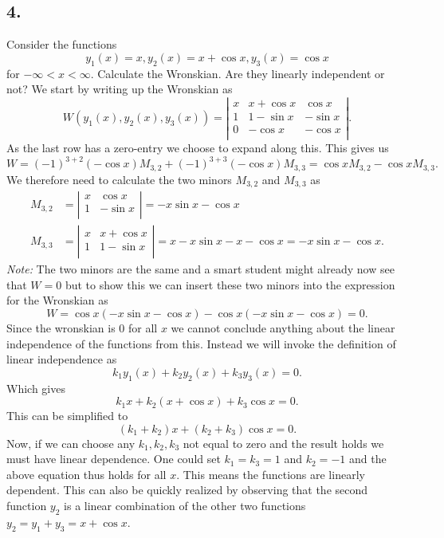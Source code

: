\subsection*{4.} Consider the functions
\[ 
y_1 (x) = x, y_2(x) = x + \cos x, y_3(x) = \cos x
\]
for $-\infty < x < \infty $. Calculate the Wronskian. Are they linearly independent or not?
\bigbreak
We start by writing up the Wronskian as
\[ 
W(y_1(x), y_2(x), y_3(x)) = \left| \begin{array}{ccc}
x & x + \cos x &  \cos x\\
1 & 1 - \sin x & - \sin x\\
0 & - \cos x & - \cos x\\
\end{array} \right|
.\]
As the last row has a zero-entry we choose to expand along this. This gives us
\[ 
W = (-1)^{3+2} (- \cos x) M_{3,2} + (-1)^{3+3} \left( - \cos x \right) M_{3,3} = \cos x M_{3,2} - \cos x M_{3,3}
.\]
We therefore need to calculate the two minors $M_{3,2}$ and $M_{3,3}$ as
\begin{align*}
  M_{3,2} &= \left| \begin{array}{cc}
  x & \cos x\\
  1 & - \sin x\\
  \end{array} \right| = -x\sin x - \cos x \\
    M_{3,3} &= \left| \begin{array}{cc}
    x & x + \cos x\\
    1  & 1 - \sin x\\
    \end{array} \right| = x - x \sin x - x - \cos x = - x \sin x - \cos x
.\end{align*}
\textit{Note:} The two minors are the same and a smart student might already now see that $W = 0$ but to show this we can insert these two minors into the expression for the Wronskian as
\[ 
W = \cos x (- x \sin x - \cos x) - \cos x (- x \sin x - \cos x) = 0
.\]
Since the wronskian is 0 for all $x$ we cannot conclude anything about the linear independence of the functions from this. Instead we will invoke the definition of linear independence as
\[ 
k_1 y_1(x) + k_2 y_2(x) + k_3 y_3(x) = 0
.\]
Which gives
\[ 
k_1 x + k_2 (x + \cos x) + k_3 \cos x = 0
.\]
This can be simplified to
\[ 
  (k_1 + k_2)x + (k_2 + k_3) \cos x = 0
.\]
Now, if we can choose any $k_1, k_2, k_3$ not equal to zero and the result holds we must have linear dependence. One could set $k_1 = k_3 = 1$ and $k_2 = -1$ and the above equation thus holds for all $x$. This means the functions are linearly dependent. This can also be quickly realized by observing that the second function $y_2$ is a linear combination of the other two functions $y_2 = y_1 + y_3 = x + \cos x$.




